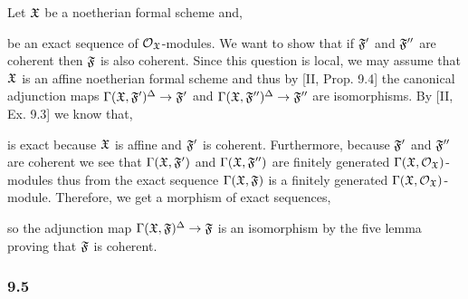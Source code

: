 \documentclass[12pt]{article}
\begin{document}
Let $\mathfrak{X}$ be a noetherian formal scheme and,
\begin{center}
\end{center}
be an exact sequence of $\mathcal{O}_{\mathfrak{X}}$-modules. We want to show that if $\mathfrak{F}'$ and $\mathfrak{F}''$ are coherent then $\mathfrak{F}$ is also coherent. Since this question is local, we may assume that $\mathfrak{X}$ is an affine noetherian formal scheme and thus by [II, Prop. 9.4] the canonical adjunction maps $\Gamma(\mathfrak{X}, \mathfrak{F}')^\Delta \to \mathfrak{F}'$ and $\Gamma(\mathfrak{X}, \mathfrak{F}'')^\Delta \to \mathfrak{F}''$ are isomorphisms. By [II, Ex. 9.3] we know that,
\begin{center}
\end{center}
is exact because $\mathfrak{X}$ is affine and $\mathfrak{F}'$ is coherent. Furthermore, because $\mathfrak{F}'$ and $\mathfrak{F}''$ are coherent we see that $\Gamma(\mathfrak{X}, \mathfrak{F}')$ and $\Gamma(\mathfrak{X}, \mathfrak{F}'')$ are finitely generated $\Gamma(\mathfrak{X}, \mathcal{O}_{\mathfrak{X}})$-modules thus from the exact sequence $\Gamma(\mathfrak{X}, \mathfrak{F})$ is a finitely generated $\Gamma(\mathfrak{X}, \mathcal{O}_{\mathfrak{X}})$-module. Therefore, we get a morphism of exact sequences,
\begin{center}
\end{center}
so the adjunction map $\Gamma(\mathfrak{X}, \mathfrak{F})^\Delta \to \mathfrak{F}$ is an isomorphism by the five lemma proving that $\mathfrak{F}$ is coherent.

\subsubsection{9.5} 
\end{document}
